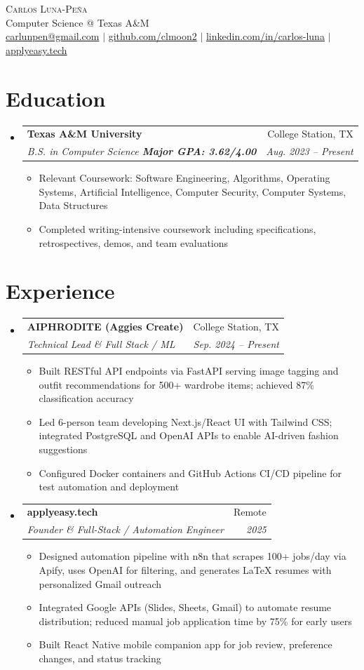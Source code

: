 \documentclass[letterpaper,11pt]{article}
\makeatletter
\newcommand{\resumeItem}[1]{
  \item\small{{#1 \vspace{-2pt}}}
}
\newcommand{\resumeSubheading}[4]{
  \vspace{-2pt}\item
    \begin{tabular*}{0.97\textwidth}[t]{l@{\extracolsep{\fill}}r}
      \textbf{#1} & #2 \\
      \textit{\small#3} & \textit{\small #4} \\
    \end{tabular*}\vspace{-7pt}
}
\newcommand{\resumeSubHeadingListStart}{\begin{itemize}[leftmargin=0.15in, label={}]}
\newcommand{\resumeSubHeadingListEnd}{\end{itemize}}
\newcommand{\resumeItemListStart}{\begin{itemize}}
\newcommand{\resumeItemListEnd}{\end{itemize}\vspace{-5pt}}
\makeatother
\begin{document}
\begin{center}
  {\Huge \scshape Carlos Luna-Pe\~na} \\ \vspace{2pt}
  Computer Science @ Texas A\&M \\
  \href{mailto:carlunpen@gmail.com}{carlunpen@gmail.com} $|$
  \href{https://github.com/clmoon2}{github.com/clmoon2} $|$
  \href{https://linkedin.com/in/carlos-luna}{linkedin.com/in/carlos-luna} $|$
  \href{https://applyeasy.tech}{applyeasy.tech}
\end{center}

\section{Education}
\resumeSubHeadingListStart
  \resumeSubheading
    {Texas A\&M University}{College Station, TX}
    {B.S. in Computer Science \quad \textbf{Major GPA: 3.62/4.00}}{Aug. 2023 -- Present}
    \resumeItemListStart
      \resumeItem{Relevant Coursework: Software Engineering, Algorithms, Operating Systems, Artificial Intelligence, Computer Security, Computer Systems, Data Structures}
      \resumeItem{Completed writing-intensive coursework including specifications, retrospectives, demos, and team evaluations}
    \resumeItemListEnd
\resumeSubHeadingListEnd

\section{Experience}
\resumeSubHeadingListStart
  \resumeSubheading
    {AIPHRODITE (Aggies Create)}{College Station, TX}
    {Technical Lead \& Full Stack / ML}{Sep. 2024 -- Present}
    \resumeItemListStart
      \resumeItem{Built RESTful API endpoints via FastAPI serving image tagging and outfit recommendations for 500+ wardrobe items; achieved 87\% classification accuracy}
      \resumeItem{Led 6-person team developing Next.js/React UI with Tailwind CSS; integrated PostgreSQL and OpenAI APIs to enable AI-driven fashion suggestions}
      \resumeItem{Configured Docker containers and GitHub Actions CI/CD pipeline for test automation and deployment}
    \resumeItemListEnd

  \resumeSubheading
    {applyeasy.tech}{Remote}
    {Founder \& Full-Stack / Automation Engineer}{2025}
    \resumeItemListStart
      \resumeItem{Designed automation pipeline with n8n that scrapes 100+ jobs/day via Apify, uses OpenAI for filtering, and generates LaTeX resumes with personalized Gmail outreach}
      \resumeItem{Integrated Google APIs (Slides, Sheets, Gmail) to automate resume distribution; reduced manual job application time by 75\% for early users}
      \resumeItem{Built React Native mobile companion app for job review, preference changes, and status tracking}
    \resumeItemListEnd
\resumeSubHeadingListEnd
\end{document}
